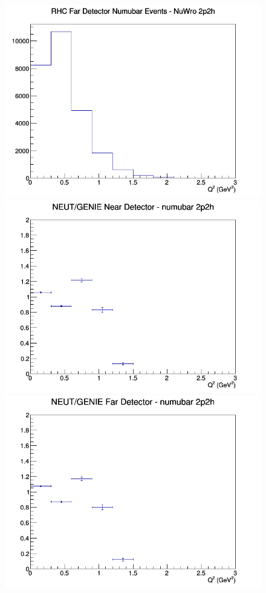 \documentclass[12pt]{article}
\begin{document}
\begin{figure}[h]
\endminipage
{}
\includegraphics[width=\linewidth]{Q2/nominal/2p2h_RHC_FD_numubar_Q2_NuWro.png}
\endminipage
\newline
{}
\includegraphics[width=\linewidth]{Q2/nominal/ratios/2p2h_NEUT_GENIE_numubar_near_Q2.png}
\endminipage
{}
\includegraphics[width=\linewidth]{Q2/nominal/ratios/2p2h_NEUT_GENIE_numubar_far_Q2.png}

\end{figure}
\end{document}

